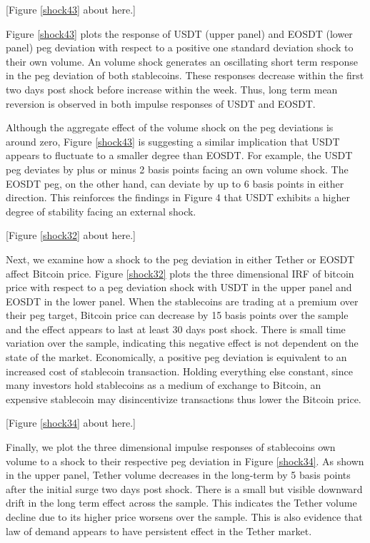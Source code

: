\documentclass[12pt]{article}
\begin{document}
\begin{center}
	[Figure \ref{shock43} about here.]
\end{center}


Figure \ref{shock43} plots the response of USDT (upper panel) and EOSDT (lower panel) peg deviation with respect to a positive one standard deviation shock to their own volume. An volume shock generates an oscillating short term response in the peg deviation of both stablecoins. These responses decrease within the first two days post shock before increase within the week. Thus, long term mean reversion is observed in both impulse responses of USDT and EOSDT.


Although the aggregate effect of the volume shock on the peg deviations is around zero, Figure \ref{shock43} is suggesting a similar implication that USDT appears to fluctuate to a smaller degree than EOSDT. For example, the USDT peg deviates by plus or minus 2 basis points facing an own volume shock. The EOSDT peg, on the other hand, can deviate by up to 6 basis points in either direction. This reinforces the findings in Figure 4 that USDT exhibits a higher degree of stability facing an external shock. 


\begin{center}
	[Figure \ref{shock32} about here.]
\end{center}


Next, we examine how a shock to the peg deviation in either Tether or EOSDT affect Bitcoin price. Figure \ref{shock32} plots the three dimensional IRF of bitcoin price with respect to a peg deviation shock with USDT in the upper panel and EOSDT in the lower panel. When the stablecoins are trading at a premium over their peg target, Bitcoin price can decrease by 15 basis points over the sample and the effect appears to last at least 30 days post shock. There is small time variation over the sample, indicating this negative effect is not dependent on the state of the market. Economically, a positive peg deviation is equivalent to an increased cost of stablecoin transaction. Holding everything else constant,  since many investors hold stablecoins as a medium of exchange to Bitcoin, an expensive stablecoin may disincentivize transactions thus lower the Bitcoin price. 


\begin{center}
	[Figure \ref{shock34} about here.]
\end{center}


Finally, we plot the three dimensional impulse responses of stablecoins own volume to a shock to their respective peg deviation in Figure \ref{shock34}. As shown in the upper panel, Tether volume decreases in the long-term by 5 basis points after the initial surge two days post shock. There is a small but visible downward drift in the long term effect across the sample. This indicates the Tether volume decline due to its higher price worsens over the sample. This is also evidence that law of demand appears to have persistent effect in the Tether market. 
\end{document}
